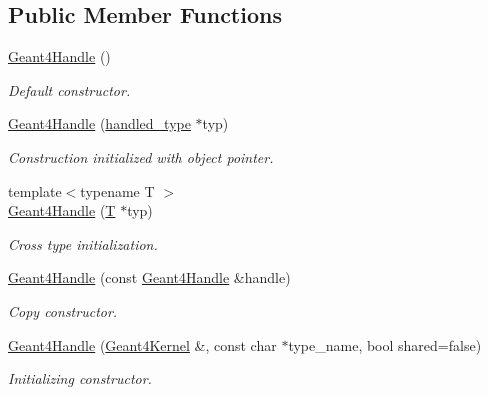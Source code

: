 \subsection*{Public Member Functions}
\begin{DoxyCompactItemize}
\item 
\hyperlink{class_d_d4hep_1_1_simulation_1_1_geant4_handle_a0c81dba8f012c42cf56aa9de145ceba7}{Geant4Handle} ()
\begin{DoxyCompactList}\small\item\em Default constructor. \item\end{DoxyCompactList}\item 
\hyperlink{class_d_d4hep_1_1_simulation_1_1_geant4_handle_a82201301931f3fc74f9ad0c4fe6b9071}{Geant4Handle} (\hyperlink{class_d_d4hep_1_1_simulation_1_1_geant4_handle_a35e583b9228e38c95d23112ad19b645d}{handled\_\-type} $\ast$typ)
\begin{DoxyCompactList}\small\item\em Construction initialized with object pointer. \item\end{DoxyCompactList}\item 
{\footnotesize template$<$typename T $>$ }\\\hyperlink{class_d_d4hep_1_1_simulation_1_1_geant4_handle_abdd84b393cb29237c0511a773e270ffc}{Geant4Handle} (\hyperlink{class_t}{T} $\ast$typ)
\begin{DoxyCompactList}\small\item\em Cross type initialization. \item\end{DoxyCompactList}\item 
\hyperlink{class_d_d4hep_1_1_simulation_1_1_geant4_handle_a285188049a0dfb7e4129c2ba4556c105}{Geant4Handle} (const \hyperlink{class_d_d4hep_1_1_simulation_1_1_geant4_handle}{Geant4Handle} \&handle)
\begin{DoxyCompactList}\small\item\em Copy constructor. \item\end{DoxyCompactList}\item 
\hyperlink{class_d_d4hep_1_1_simulation_1_1_geant4_handle_a765cd4c227a41d33781599c71fc11e51}{Geant4Handle} (\hyperlink{class_d_d4hep_1_1_simulation_1_1_geant4_kernel}{Geant4Kernel} \&, const char $\ast$type\_\-name, bool shared=false)
\begin{DoxyCompactList}\small\item\em Initializing constructor. \item\end{DoxyCompactList}\item 

\end{DoxyCompactItemize}
